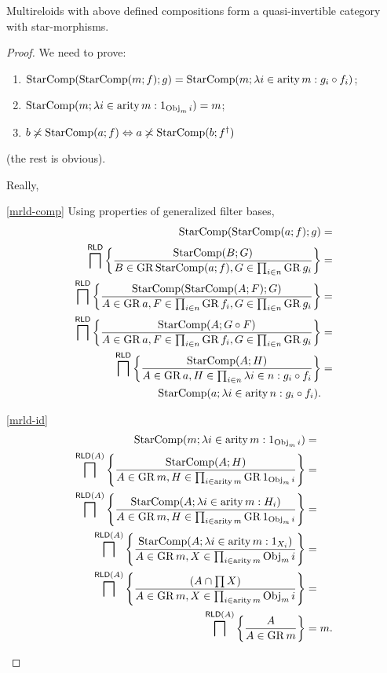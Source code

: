 \begin{thm}
Multireloids with above defined compositions form a quasi-invertible
category with star-morphisms.\end{thm}
\begin{proof}
We need to prove:
\begin{enumerate}
\item \label{mrld-comp}$\operatorname{StarComp}(\operatorname{StarComp}(m;f);g)=\operatorname{StarComp}(m;\lambda i\in\operatorname{arity} m:g_{i}\circ f_{i})$;
\item \label{mrld-id}$\operatorname{StarComp}(m;\lambda i\in\operatorname{arity} m:1_{\operatorname{Obj}_{m}i})=m$;
\item \label{mrld-cross}$b\not\asymp\operatorname{StarComp}(a;f)\Leftrightarrow a\not\asymp\operatorname{StarComp}(b;f^{\dagger})$
\end{enumerate}
(the rest is obvious).

Really,
\begin{widedisorder}
\item [{\ref{mrld-comp}}] Using properties of generalized filter bases,
\begin{align*}
\operatorname{StarComp}(\operatorname{StarComp}(a;f);g) & =\\
\bigsqcap^{\mathsf{RLD}}\left\{ \frac{\operatorname{StarComp}(B;G)}{B\in\operatorname{GR}\operatorname{StarComp}(a;f),G\in\prod_{i\in n}\operatorname{GR} g_{i}}\right\} & =\\
\bigsqcap^{\mathsf{RLD}}\left\{ \frac{\operatorname{StarComp}(\operatorname{StarComp}(A;F);G)}{A\in\operatorname{GR} a,F\in\prod_{i\in n}\operatorname{GR} f_{i},G\in\prod_{i\in n}\operatorname{GR} g_{i}}\right\} & =\\
\bigsqcap^{\mathsf{RLD}}\left\{ \frac{\operatorname{StarComp}(A;G\circ F)}{A\in\operatorname{GR} a,F\in\prod_{i\in n}\operatorname{GR} f_{i},G\in\prod_{i\in n}\operatorname{GR} g_{i}}\right\} & =\\
\bigsqcap^{\mathsf{RLD}}\left\{ \frac{\operatorname{StarComp}(A;H)}{A\in\operatorname{GR} a,H\in\prod_{i\in n}\lambda i\in n:g_{i}\circ f_{i}}\right\} & =\\
\operatorname{StarComp}(a;\lambda i\in\operatorname{arity} n:g_{i}\circ f_{i}).
\end{align*}

\item [{\ref{mrld-id}}] ~
\begin{align*}
\operatorname{StarComp}(m;\lambda i\in\operatorname{arity} m:1_{\operatorname{Obj}_{m}i}) & =\\
\bigsqcap^{\mathsf{RLD}(A)}\left\{ \frac{\operatorname{StarComp}(A;H)}{A\in\operatorname{GR} m,H\in\prod_{i\in\operatorname{arity} m}\operatorname{GR}1_{\operatorname{Obj}_{m}i}}\right\} & =\\
\bigsqcap^{\mathsf{RLD}(A)}\left\{ \frac{\operatorname{StarComp}(A;\lambda i\in\operatorname{arity} m:H_{i})}{A\in\operatorname{GR} m,H\in\prod_{i\in\operatorname{arity} m}\operatorname{GR}1_{\operatorname{Obj}_{m}i}}\right\} & =\\
\bigsqcap^{\mathsf{RLD}(A)}\left\{ \frac{\operatorname{StarComp}(A;\lambda i\in\operatorname{arity} m:1_{X_{i}})}{A\in\operatorname{GR} m,X\in\prod_{i\in\operatorname{arity} m}\operatorname{Obj}_{m}i}\right\} & =\\
\bigsqcap^{\mathsf{RLD}(A)}\left\{ \frac{(A\cap\prod X)}{A\in\operatorname{GR} m,X\in\prod_{i\in\operatorname{arity} m}\operatorname{Obj}_{m}i}\right\} & =\\
\bigsqcap^{\mathsf{RLD}(A)}\left\{ \frac{A}{A\in\operatorname{GR} m}\right\} & =m.
\end{align*}


\end{widedisorder}
\end{proof}
